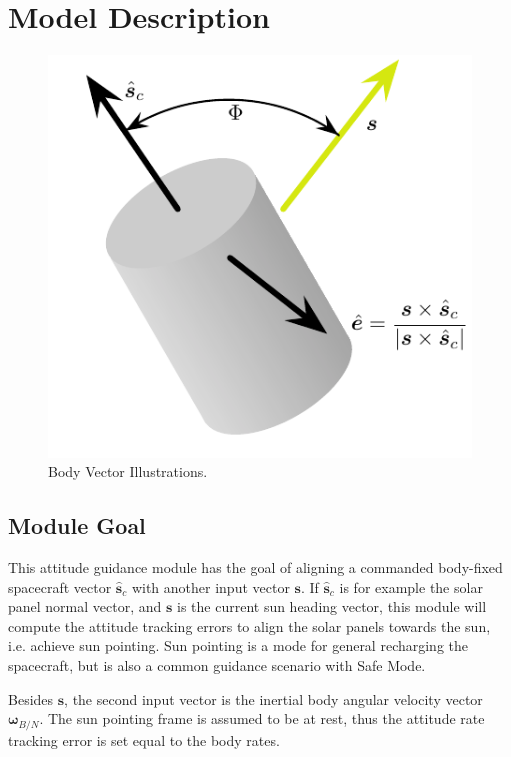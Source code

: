 
\section{Model Description}

\begin{figure}[t]
	\centerline{
		\includegraphics{Figures/sunHeading}
	}
	\caption{Body Vector Illustrations.}
	\label{fig:Fig1}
\end{figure}

\subsection{Module Goal}
This attitude guidance module has the goal of aligning a commanded body-fixed spacecraft vector $\hat{\bm s}_{c}$ with another input vector $\bm s$.  If $\hat{\bm s}_{c}$ is for example the solar panel normal vector, and $\bm s$ is the current sun heading vector, this module will compute the attitude tracking errors to align the solar panels towards the sun, i.e. achieve sun pointing.  Sun pointing is a mode for general recharging the spacecraft, but is also a common guidance scenario with Safe Mode.  

Besides $\bm s$, the second input vector is the inertial body angular velocity vector $\bm\omega_{B/N}$.  The sun pointing frame is assumed to be at rest, thus the attitude rate tracking error is set equal to the body rates.  

